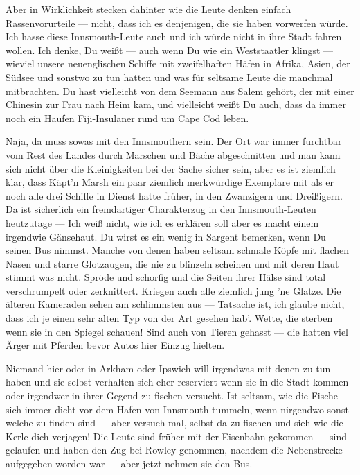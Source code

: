 Aber in Wirklichkeit stecken dahinter wie die Leute denken einfach Rassenvorurteile --- nicht, dass ich es denjenigen, die sie haben vorwerfen würde. Ich hasse diese Innsmouth-Leute auch und ich würde nicht in ihre Stadt fahren wollen. Ich denke, Du weißt --- auch wenn Du wie ein Weststaatler klingst --- wieviel unsere neuenglischen Schiffe mit zweifelhaften Häfen in Afrika, Asien, der Südsee und sonstwo zu tun hatten und was für seltsame Leute die manchmal mitbrachten. Du hast vielleicht von dem Seemann aus Salem gehört, der mit einer Chinesin zur Frau nach Heim kam, und vielleicht weißt Du auch, dass da immer noch ein Haufen Fiji-Insulaner rund um Cape Cod leben.

Naja, da muss sowas mit den Innsmouthern sein. Der Ort war immer furchtbar vom Rest des Landes durch Marschen und Bäche abgeschnitten und man kann sich nicht über die Kleinigkeiten bei der Sache sicher sein, aber es ist ziemlich klar, dass Käpt'n Marsh ein paar ziemlich merkwürdige Exemplare mit als er noch alle drei Schiffe in Dienst hatte früher, in den Zwanzigern und Dreißigern. Da ist sicherlich ein fremdartiger Charakterzug in den Innsmouth-Leuten heutzutage --- Ich weiß nicht, wie ich es erklären soll aber es macht einem irgendwie Gänsehaut. Du wirst es ein wenig in Sargent bemerken, wenn Du seinen Bus nimmst. Manche von denen haben seltsam schmale Köpfe mit flachen Nasen und starre Glotzaugen, die nie zu blinzeln scheinen und mit deren Haut stimmt was nicht. Spröde und schorfig und die Seiten ihrer Hälse sind total verschrumpelt oder zerknittert. Kriegen auch alle ziemlich jung 'ne Glatze. Die älteren Kameraden sehen am schlimmsten aus --- Tatsache ist, ich glaube nicht, dass ich je einen sehr alten Typ von der Art gesehen hab'. Wette, die sterben wenn sie in den Spiegel schauen! Sind auch von Tieren gehasst --- die hatten viel Ärger mit Pferden bevor Autos hier Einzug hielten.

Niemand hier oder in Arkham oder Ipswich will irgendwas mit denen zu tun haben und sie selbst verhalten sich eher reserviert wenn sie in die Stadt kommen oder irgendwer in ihrer Gegend zu fischen versucht. Ist seltsam, wie die Fische sich immer dicht vor dem Hafen von Innsmouth tummeln, wenn nirgendwo sonst welche zu finden sind --- aber versuch mal, selbst da zu fischen und sieh wie die Kerle dich verjagen! Die Leute sind früher mit der Eisenbahn gekommen --- sind gelaufen und haben den Zug bei Rowley genommen, nachdem die Nebenstrecke aufgegeben worden war --- aber jetzt nehmen sie den Bus.

